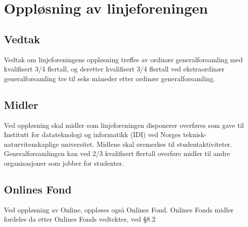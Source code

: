 \chapter{Oppløsning av linjeforeningen}
\section{Vedtak}
\vspace{23pt}

Vedtak om linjeforeningens oppløsning treffes av ordinær generalforsamling med kvalifisert 3/4 flertall, og deretter kvalifisert 3/4 flertall ved ekstraordinær generalforsamling tre til seks måneder etter ordinær generalforsamling.

\section{Midler}
\vspace{23pt}

Ved oppløsning skal midler som linjeforeningen disponerer overføres som gave til \mbox{Institutt} for datateknologi og informatikk (IDI) ved Norges teknisk-\linebreak naturvitenskaplige universitet. Midlene skal øremerkes til studentaktiviteter. Generalforsamlingen kan ved 2/3 kvalifisert flertall overføre midler til andre organisasjoner som jobber for studenter.

\section{Onlines Fond}
\vspace{23pt}

Ved oppløsning av Online, oppløses også Onlines Fond. Onlines Fonds midler fordeles da etter Onlines Fonds vedtekter, ved §8.2
